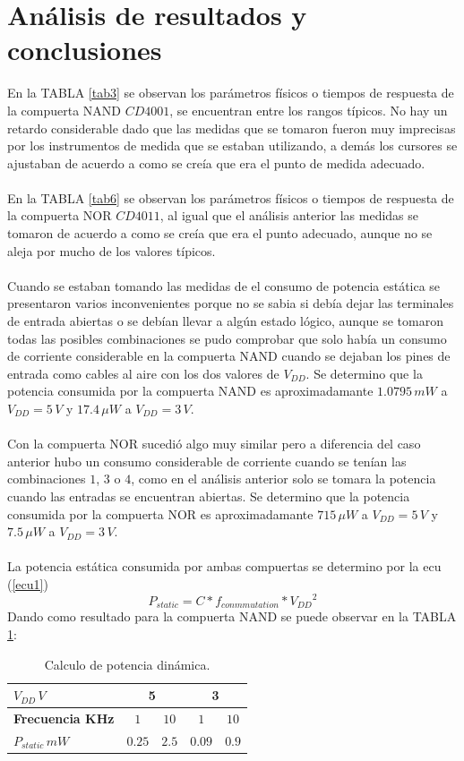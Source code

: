 \documentclass[twocolumn]{IEEEtran}
\begin{document}
\section{Análisis de resultados y conclusiones}
\noindent
En la TABLA \ref{tab3} se observan los parámetros físicos o tiempos de respuesta de la compuerta NAND $CD4001$, se encuentran entre los rangos típicos. No hay un retardo considerable dado que las medidas que se tomaron fueron muy imprecisas por los instrumentos de medida que se estaban utilizando, a demás los cursores se ajustaban de acuerdo a como se creía que era el punto de medida adecuado.\\\\
En la TABLA \ref{tab6} se observan los parámetros físicos o tiempos de respuesta de la compuerta NOR $CD4011$, al igual que el análisis anterior las medidas se tomaron de acuerdo a como se creía que era el punto adecuado, aunque no se aleja por mucho de los valores típicos.\\\\
Cuando se estaban tomando las medidas de el consumo de potencia estática se presentaron varios inconvenientes porque no se sabia si debía dejar las terminales de entrada abiertas o se debían llevar a algún estado lógico, aunque se tomaron todas las posibles combinaciones se pudo comprobar que solo había un consumo de corriente considerable en la compuerta NAND cuando se dejaban los pines de entrada como cables al aire con los dos valores de $V_{DD}$. Se determino que la potencia consumida por la compuerta NAND es aproximadamante $1.0795\, mW$ a $V_{DD}=5\, V$ y $17.4\,\mu W$ a $V_{DD}=3\, V$.\\\\
Con la compuerta NOR sucedió algo muy similar pero a diferencia del caso anterior hubo un consumo considerable de corriente cuando se tenían las combinaciones $1$, $3$ o $4$, como en el análisis anterior solo se tomara la potencia cuando las entradas se encuentran abiertas. Se determino que la potencia consumida por la compuerta NOR es aproximadamante $715\,\mu W$ a $V_{DD}=5\, V$ y $7.5\,\mu W$ a $V_{DD}=3\, V$.\\\\
La potencia estática consumida por ambas compuertas se determino por la ecu (\ref{ecu1})
\begin{equation}
 P_{static}=C*f_{conmmutation}*{V_{DD}}^{2}
\label{ecu1}
\end{equation}
\noindent
Dando como resultado para la compuerta NAND se puede observar en la TABLA \ref{tab9}:
\begin{table}[H]
  \caption{Calculo de potencia dinámica.}
    \begin{tabular}{|l|c|c|c|c|}\hline
      $V_{DD}\, V$ & \multicolumn{2}{c|}{\textbf{5}}  & \multicolumn{2}{c|}{\textbf{3}} \\ \hline
      \textbf{Frecuencia KHz} & $1$ & $10$ & $1$ & $10$ \\ \hline
      $P_{static}\,mW$ & $0.25$ & $2.5$ & $0.09$ & $0.9$ \\ \hline
    \end{tabular}
  \label{tab9}
\end{table}
\end{document}
